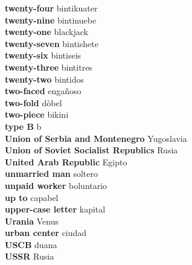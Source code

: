 \textbf{ twenty-four  } bintikuater \\
\textbf{ twenty-nine  } bintinuebe \\
\textbf{ twenty-one  } blackjack \\
\textbf{ twenty-seven  } bintishete \\
\textbf{ twenty-six  } bintiseis \\
\textbf{ twenty-three  } bintitres \\
\textbf{ twenty-two  } bintidos \\
\textbf{ two-faced  } engañoso \\
\textbf{ two-fold  } dòbel \\
\textbf{ two-piece  } bikini \\
\textbf{ type B  } b \\
\textbf{ Union of Serbia and Montenegro  } Yugoslavia \\
\textbf{ Union of Soviet Socialist Republics  } Rusia \\
\textbf{ United Arab Republic  } Egipto \\
\textbf{ unmarried man  } soltero \\
\textbf{ unpaid worker  } boluntario \\
\textbf{ up to  } capabel \\
\textbf{ upper-case letter  } kapital \\
\textbf{ Urania  } Venus \\
\textbf{ urban center  } ciudad \\
\textbf{ USCB  } duana \\
\textbf{ USSR  } Rusia \\
